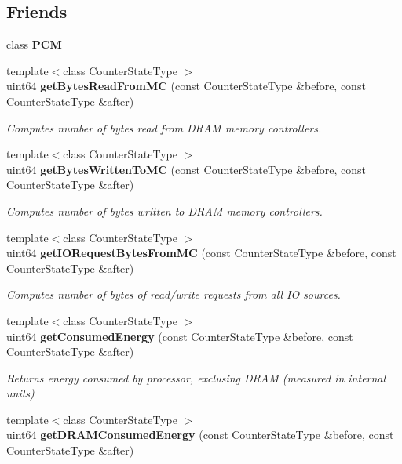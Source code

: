 \subsection*{Friends}
\begin{DoxyCompactItemize}
\item 
class {\bfseries P\+CM}\label{classUncoreCounterState_ab5f56d2e95ba3daf52c17b8a1d356d64}

\item 
{\footnotesize template$<$class Counter\+State\+Type $>$ }\\uint64 {\bf get\+Bytes\+Read\+From\+MC} (const Counter\+State\+Type \&before, const Counter\+State\+Type \&after)
\begin{DoxyCompactList}\small\item\em Computes number of bytes read from D\+R\+AM memory controllers. \end{DoxyCompactList}\item 
{\footnotesize template$<$class Counter\+State\+Type $>$ }\\uint64 {\bf get\+Bytes\+Written\+To\+MC} (const Counter\+State\+Type \&before, const Counter\+State\+Type \&after)
\begin{DoxyCompactList}\small\item\em Computes number of bytes written to D\+R\+AM memory controllers. \end{DoxyCompactList}\item 
{\footnotesize template$<$class Counter\+State\+Type $>$ }\\uint64 {\bf get\+I\+O\+Request\+Bytes\+From\+MC} (const Counter\+State\+Type \&before, const Counter\+State\+Type \&after)
\begin{DoxyCompactList}\small\item\em Computes number of bytes of read/write requests from all IO sources. \end{DoxyCompactList}\item 
{\footnotesize template$<$class Counter\+State\+Type $>$ }\\uint64 {\bf get\+Consumed\+Energy} (const Counter\+State\+Type \&before, const Counter\+State\+Type \&after)
\begin{DoxyCompactList}\small\item\em Returns energy consumed by processor, exclusing D\+R\+AM (measured in internal units) \end{DoxyCompactList}\item 
{\footnotesize template$<$class Counter\+State\+Type $>$ }\\uint64 {\bf get\+D\+R\+A\+M\+Consumed\+Energy} (const Counter\+State\+Type \&before, const Counter\+State\+Type \&after)

\end{DoxyCompactItemize}
